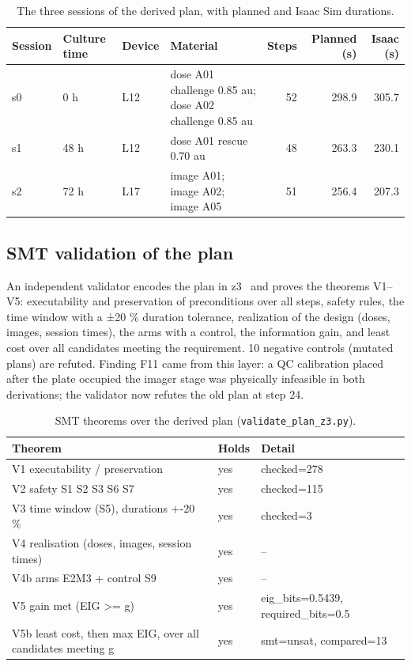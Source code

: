 \documentclass[10pt,a4paper]{article}
\begin{document}
\begin{table}[tbp]\centering\small
\caption{The three sessions of the derived plan, with planned and Isaac Sim durations.}\label{tab:sessions}
\begin{tabularx}{\linewidth}{lllXrrr}\toprule
\textbf{Session} & \textbf{Culture time} & \textbf{Device} & \textbf{Material} & \textbf{Steps} & \textbf{Planned (s)} & \textbf{Isaac (s)} \\\midrule
s0 & 0 h & L12 & dose A01 challenge 0.85 au; dose A02 challenge 0.85 au & 52 & 298.9 & 305.7 \\
s1 & 48 h & L12 & dose A01 rescue 0.70 au & 48 & 263.3 & 230.1 \\
s2 & 72 h & L17 & image A01; image A02; image A05 & 51 & 256.4 & 207.3 \\\bottomrule
\end{tabularx}
\end{table}

\subsection{SMT validation of the plan}\label{sec:z3}

An independent validator encodes the plan in z3~\citep{demoura2008} and proves the theorems V1–V5: executability and preservation of preconditions over all steps, safety rules, the time window with a ±20 \% duration tolerance, realization of the design (doses, images, session times), the arms with a control, the information gain, and least cost over all candidates meeting the requirement. 10 negative controls (mutated plans) are refuted. Finding F11 came from this layer: a QC calibration placed after the plate occupied the imager stage was physically infeasible in both derivations; the validator now refutes the old plan at step 24.

\begin{table}[tbp]\centering\small
\caption{SMT theorems over the derived plan (\texttt{validate\_\allowbreak{}plan\_\allowbreak{}z3.py}).}\label{tab:z3}
\begin{tabularx}{\linewidth}{XlX}\toprule
\textbf{Theorem} & \textbf{Holds} & \textbf{Detail} \\\midrule
V1 executability / preservation & yes & checked=278 \\
V2 safety S1 S2 S3 S6 S7 & yes & checked=115 \\
V3 time window (S5), durations +-20 \% & yes & checked=3 \\
V4 realisation (doses, images, session times) & yes & – \\
V4b arms E2M3 + control S9 & yes & – \\
V5 gain met (EIG >= g) & yes & eig\_\allowbreak{}bits=0.5439, required\_\allowbreak{}bits=0.5 \\
V5b least cost, then max EIG, over all candidates meeting g & yes & smt=unsat, compared=13 \\\bottomrule
\end{tabularx}
\end{table}
\end{document}
